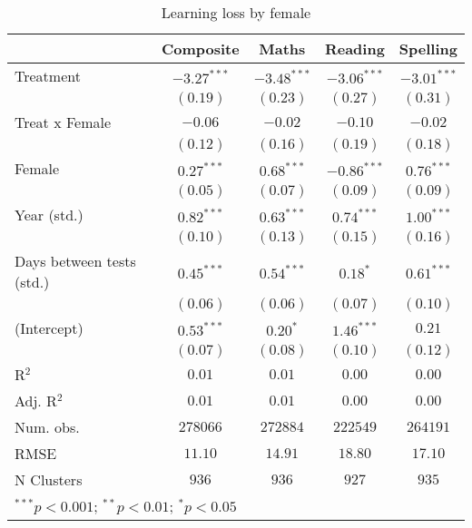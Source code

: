 
\begin{table}
\begin{center}
\begin{tabular}{l c c c c}
\hline
 & Composite & Maths & Reading & Spelling \\
\hline
Treatment                 & $-3.27^{***}$ & $-3.48^{***}$ & $-3.06^{***}$ & $-3.01^{***}$ \\
                          & $(0.19)$      & $(0.23)$      & $(0.27)$      & $(0.31)$      \\
Treat x Female            & $-0.06$       & $-0.02$       & $-0.10$       & $-0.02$       \\
                          & $(0.12)$      & $(0.16)$      & $(0.19)$      & $(0.18)$      \\
Female                    & $0.27^{***}$  & $0.68^{***}$  & $-0.86^{***}$ & $0.76^{***}$  \\
                          & $(0.05)$      & $(0.07)$      & $(0.09)$      & $(0.09)$      \\
Year (std.)               & $0.82^{***}$  & $0.63^{***}$  & $0.74^{***}$  & $1.00^{***}$  \\
                          & $(0.10)$      & $(0.13)$      & $(0.15)$      & $(0.16)$      \\
Days between tests (std.) & $0.45^{***}$  & $0.54^{***}$  & $0.18^{*}$    & $0.61^{***}$  \\
                          & $(0.06)$      & $(0.06)$      & $(0.07)$      & $(0.10)$      \\
(Intercept)               & $0.53^{***}$  & $0.20^{*}$    & $1.46^{***}$  & $0.21$        \\
                          & $(0.07)$      & $(0.08)$      & $(0.10)$      & $(0.12)$      \\
\hline
R$^2$                     & $0.01$        & $0.01$        & $0.00$        & $0.00$        \\
Adj. R$^2$                & $0.01$        & $0.01$        & $0.00$        & $0.00$        \\
Num. obs.                 & $278066$      & $272884$      & $222549$      & $264191$      \\
RMSE                      & $11.10$       & $14.91$       & $18.80$       & $17.10$       \\
N Clusters                & $936$         & $936$         & $927$         & $935$         \\
\hline
\multicolumn{5}{l}{\scriptsize{$^{***}p<0.001$; $^{**}p<0.01$; $^{*}p<0.05$}}
\end{tabular}
\caption{Learning loss by female}
\label{tablefemale}
\end{center}
\end{table}
